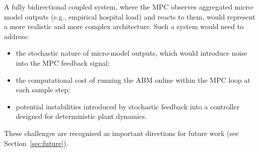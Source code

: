 A fully bidirectional coupled system, where the MPC observes aggregated micro-model outputs (e.g., empirical hospital load) and reacts to them, would represent a more realistic and more complex architecture.
Such a system would need to address:
\begin{itemize}
  \item the stochastic nature of micro-model outputs, which would introduce noise into the MPC feedback signal;
  \item the computational cost of running the ABM online within the MPC loop at each sample step;
  \item potential instabilities introduced by stochastic feedback into a controller designed for deterministic plant dynamics.
\end{itemize}
These challenges are recognised as important directions for future work (see Section~\ref{sec:future}).
